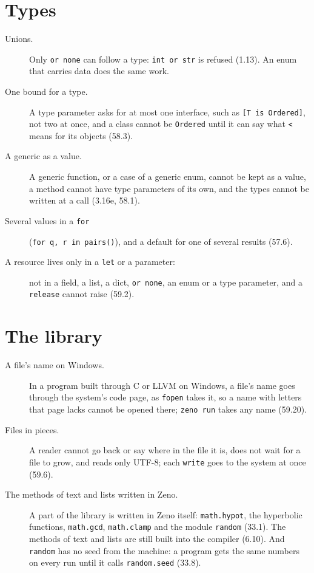 \section{Types}

\begin{description}
\item[Unions.] Only \verb|or none| can follow a type: \verb|int or str|
  is refused (1.13). An enum that carries data does the same work.
\item[One bound for a type.] A type parameter asks for at most one
  interface, such as \verb|[T is Ordered]|, not two at once, and a
  class cannot be \verb|Ordered| until it can say what \verb|<| means
  for its objects (58.3).
\item[A generic as a value.] A generic function, or a case of a
  generic enum, cannot be kept as a value, a method cannot have type
  parameters of its own, and the types cannot be written at a call
  (3.16e, 58.1).
\item[Several values in a \texttt{for}] (\verb|for q, r in pairs()|),
  and a default for one of several results (57.6).
\item[A resource lives only in a \texttt{let} or a parameter:] not in a
  field, a list, a dict, \verb|or none|, an enum or a type parameter,
  and a \verb|release| cannot raise (59.2).
\end{description}

\section{The library}

\begin{description}
\item[A file's name on Windows.] In a program built through C or LLVM
  on Windows, a file's name goes through the system's code page, as
  \verb|fopen| takes it, so a name with letters that page lacks cannot
  be opened there; \verb|zeno run| takes any name (59.20).
\item[Files in pieces.] A reader cannot go back or say where in the
  file it is, does not wait for a file to grow, and reads only UTF-8;
  each \verb|write| goes to the system at once (59.6).
\item[The methods of text and lists written in Zeno.] A part of the
  library is written in Zeno itself: \verb|math.hypot|, the hyperbolic
  functions, \verb|math.gcd|, \verb|math.clamp| and the module
  \verb|random| (33.1). The methods of text and lists are still built
  into the compiler (6.10). And \verb|random| has no seed from the
  machine: a program gets the same numbers on every run until it
  calls \verb|random.seed| (33.8).
\end{description}

